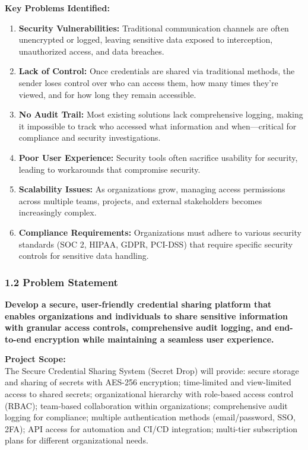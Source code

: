 \documentclass[12pt,a4paper]{article}
\begin{document}
\textbf{Key Problems Identified:}
\begin{enumerate}[leftmargin=*]
  \item \textbf{Security Vulnerabilities:} Traditional communication channels are often unencrypted or logged, leaving sensitive data exposed to interception, unauthorized access, and data breaches.
  \item \textbf{Lack of Control:} Once credentials are shared via traditional methods, the sender loses control over who can access them, how many times they're viewed, and for how long they remain accessible.
  \item \textbf{No Audit Trail:} Most existing solutions lack comprehensive logging, making it impossible to track who accessed what information and when---critical for compliance and security investigations.
  \item \textbf{Poor User Experience:} Security tools often sacrifice usability for security, leading to workarounds that compromise security.
  \item \textbf{Scalability Issues:} As organizations grow, managing access permissions across multiple teams, projects, and external stakeholders becomes increasingly complex.
  \item \textbf{Compliance Requirements:} Organizations must adhere to various security standards (SOC 2, HIPAA, GDPR, PCI-DSS) that require specific security controls for sensitive data handling.
\end{enumerate}

\subsubsection*{1.2 Problem Statement}

\textbf{Develop a secure, user-friendly credential sharing platform that enables organizations and individuals to share sensitive information with granular access controls, comprehensive audit logging, and end-to-end encryption while maintaining a seamless user experience.}

\textbf{Project Scope:}\\
The Secure Credential Sharing System (Secret Drop) will provide: secure storage and sharing of secrets with AES-256 encryption; time-limited and view-limited access to shared secrets; organizational hierarchy with role-based access control (RBAC); team-based collaboration within organizations; comprehensive audit logging for compliance; multiple authentication methods (email/password, SSO, 2FA); API access for automation and CI/CD integration; multi-tier subscription plans for different organizational needs.
\end{document}
